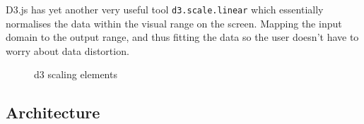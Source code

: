 \documentclass[a4paper,11pt,titlepage]{article}
\begin{document}
		\begin{figure}[H]
    			\centering	
    			\qquad
    			\caption{}%
    			\label{fig:epoch_layer}
	\end{figure}

	D3.js has yet another very useful tool \texttt{d3.scale.linear} which essentially normalises the data within the visual range on the screen. Mapping the input domain to the output range, and thus fitting the data so the user doesn't have to worry about data distortion. 
	
	\begin{figure}[H]
    			\caption{d3 scaling elements}%
	\end{figure}	
		
	\subsection{Architecture}
	
\end{document}
